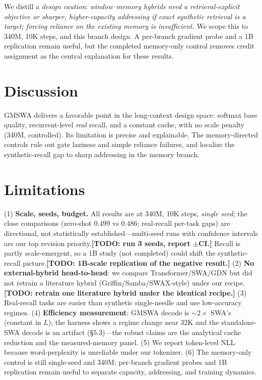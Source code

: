\documentclass[letterpaper]{article} %
\newif\iftodoon \todoontrue
\newcommand{\todo}[1]{\iftodoon{\footnotesize\textbf{[TODO: #1]}}\fi}
\begin{document}
We distill a \emph{design caution}: \emph{window--memory hybrids need a retrieval-explicit objective or sharper, higher-capacity addressing if exact synthetic retrieval is a target; forcing reliance on the existing memory is insufficient.} We scope this to 340M, 10K steps, and this branch design. A per-branch gradient probe and a 1B replication remain useful, but the completed memory-only control removes credit assignment as the central explanation for these results.

\section{Discussion}
GMSWA delivers a favorable point in the long-context design space: softmax base quality, recurrent-level \emph{real} recall, and a constant cache, with no scale penalty (340M, controlled). Its limitation is precise and explainable. The memory-directed controls rule out gate laziness and simple reliance failures, and localize the synthetic-recall gap to sharp addressing in the memory branch.

\section{Limitations}
(1) \textbf{Scale, seeds, budget.} All results are at 340M, 10K steps, \emph{single seed}; the close comparisons (zero-shot $0.499$ vs $0.486$; real-recall per-task gaps) are directional, not statistically established---multi-seed runs with confidence intervals are our top revision priority.\todo{run 3 seeds, report $\pm$CI.} Recall is partly scale-emergent, so a 1B study (not completed) could shift the synthetic-recall picture.\todo{1B-scale replication of the negative result.} (2) \textbf{No external-hybrid head-to-head}: we compare Transformer/SWA/GDN but did not retrain a literature hybrid (Griffin/Samba/SWAX-style) under our recipe.\todo{retrain one literature hybrid under the identical recipe.} (3) Real-recall tasks are easier than synthetic single-needle and use low-accuracy regimes. (4) \textbf{Efficiency measurement}: GMSWA decode is ${\sim}2\times$ SWA's (constant in $L$); the harness shows a regime change near 32K and the standalone-SWA decode is an artifact (\S5.3)---the robust claims are the analytical cache reduction and the measured-memory panel. (5) We report token-level NLL because word-perplexity is unreliable under our tokenizer. (6) The memory-only control is still single-seed and 340M; per-branch gradient probes and 1B replication remain useful to separate capacity, addressing, and training dynamics.
\end{document}

